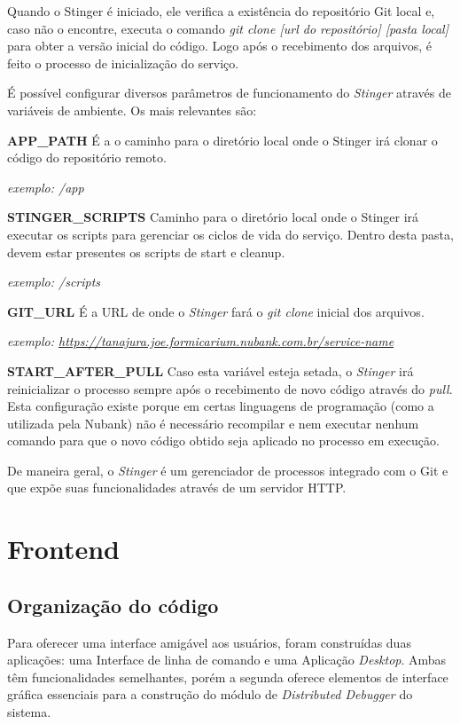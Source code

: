 	Quando o Stinger é iniciado, ele verifica a existência do repositório Git local e, caso não o encontre, executa o comando \textit{git clone [url do repositório] [pasta local]} para obter a versão inicial do código. Logo após o recebimento dos arquivos, é feito o processo de inicialização do serviço.

	É possível configurar diversos parâmetros de funcionamento do \textit{Stinger} através de variáveis de ambiente. Os mais relevantes são:
	
	\textbf{APP\_PATH}
	\newline
	É a o caminho para o diretório local onde o Stinger irá clonar o código do repositório remoto.
	
	\textit{exemplo: /app}

	\textbf{STINGER\_SCRIPTS}
	\newline
	Caminho para o diretório local onde o Stinger irá executar os scripts para gerenciar os ciclos de vida do serviço. Dentro desta pasta, devem estar presentes os scripts de start e cleanup.
	
	\textit{exemplo: /scripts}
	
	\textbf{GIT\_URL}
	\newline
	É a URL de onde o \textit{Stinger} fará o \textit{git clone} inicial dos arquivos.
	
	\textit{exemplo: \url{https://tanajura.joe.formicarium.nubank.com.br/service-name}}
	
	\textbf{START\_AFTER\_PULL}
	\newline
	Caso esta variável esteja setada, o \textit{Stinger} irá reinicializar o processo sempre após o recebimento de novo código através do \textit{pull}. Esta configuração existe porque em certas linguagens de programação (como a utilizada pela Nubank) não é necessário recompilar e nem executar nenhum comando para que o novo código obtido seja aplicado no processo em execução.
    
	De maneira geral, o \textit{Stinger} é um gerenciador de processos integrado com o Git e que expõe suas funcionalidades através de um servidor HTTP.

    \section{Frontend}  
        \subsection{Organização do código}
            Para oferecer uma interface amigável aos usuários, foram construídas duas aplicações: uma Interface de linha de comando e uma Aplicação \textit{Desktop}. Ambas têm funcionalidades semelhantes, porém a segunda oferece elementos de interface gráfica essenciais para a construção do módulo de \textit{Distributed Debugger} do sistema.
    
